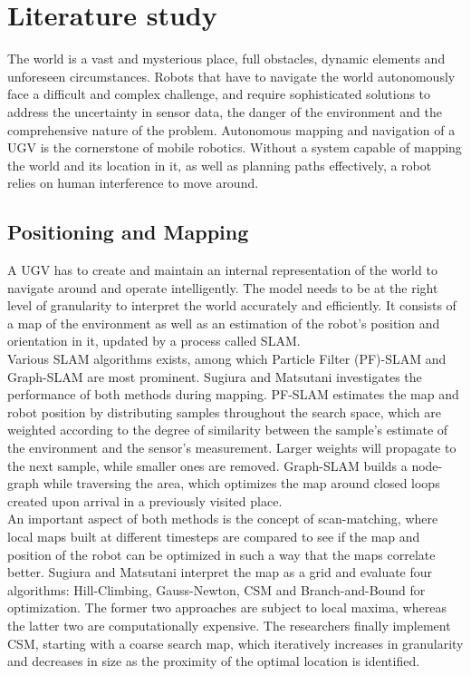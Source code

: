 
\section{Literature study}

The world is a vast and mysterious place, full obstacles, dynamic elements and unforeseen circumstances. Robots that have to navigate the world autonomously face a difficult and complex challenge, and require sophisticated solutions to address the uncertainty in sensor data, the danger of the environment and the comprehensive nature of the problem. Autonomous mapping and navigation of a UGV is the cornerstone of mobile robotics. Without a system capable of mapping the world and its location in it, as well as planning paths effectively, a robot relies on human interference
to move around.

\subsection{Positioning and Mapping}

A UGV has to create and maintain an internal representation of the world to navigate around and operate intelligently. The model needs to be at the right level of granularity to interpret the world accurately and efficiently. It consists of a map of the environment as well as an estimation of the robot's position and orientation in it, updated by a process called SLAM. \\

Various SLAM algorithms exists, among which Particle Filter (PF)-SLAM and Graph-SLAM are most prominent. Sugiura and Matsutani \cite{sugiura} investigates the performance of both methods during mapping. PF-SLAM estimates the map and robot position by distributing samples throughout the search space, which are weighted according to the degree of similarity between the sample's estimate of the environment and the sensor's measurement. Larger weights will propagate to the next sample, while smaller ones are removed. Graph-SLAM builds a node-graph while traversing the area, which optimizes the map around closed loops created upon arrival in a previously visited place. \\

An important aspect of both methods is the concept of scan-matching, where local maps built at different timesteps are compared to see if the map and position of the robot can be optimized in such a way that the maps correlate better. Sugiura and Matsutani interpret the map as a grid and evaluate four algorithms: Hill-Climbing, Gauss-Newton, CSM and Branch-and-Bound for optimization. The former two approaches are subject to local maxima, whereas the latter two are computationally expensive. The researchers finally implement CSM, starting with a coarse search map, which iteratively increases in granularity and decreases in size as the proximity of the optimal location is identified. \\

